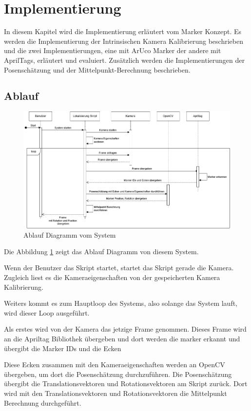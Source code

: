 \section{Implementierung}

In diesem Kapitel wird die Implementierung erläutert vom Marker Konzept. 
Es werden die Implementierung der Intrinsischen Kamera Kalibrierung beschrieben und die zwei Implementierungen, eine mit ArUco Marker der andere mit AprilTags, erläutert und evaluiert.
Zusätzlich werden die Implementierungen der Posenschätzung und der Mittelpunkt-Berechnung beschrieben.

\subsection{Ablauf}

\begin{figure}[H]
    \centering
    \includegraphics[width=\linewidth]{graphics/Ablauf.png}
    \caption{Ablauf Diagramm vom System}
    \label{fig:Ablauf}
\end{figure}

Die Abbildung \ref{fig:Ablauf} zeigt das Ablauf Diagramm von diesem System. 

Wenn der Benutzer das Skript startet, startet das Skript gerade die Kamera.
Zugleich liest es die Kameraeigenschaften von der gespeicherten Kamera Kalibrierung.

Weiters kommt es zum Hauptloop des Systems, also solange das System lauft, wird dieser Loop ausgeführt.

Als erstes wird von der Kamera das jetzige Frame genommen. 
Dieses Frame wird an die Apriltag Bibliothek übergeben und dort werden die marker erkannt und übergibt die Marker IDs und die Ecken

Diese Ecken zusammen mit den Kameraeigenschaften werden an OpenCV übergeben, um dort die Posenschätzung durchzuführen.
Die Posenschätzung übergibt die Translationsvektoren und Rotationsvektoren am Skript zurück. 
Dort wird mit den Translationsvektoren und Rotationsvektoren die Mittelpunkt Berechnung durchgeführt.

